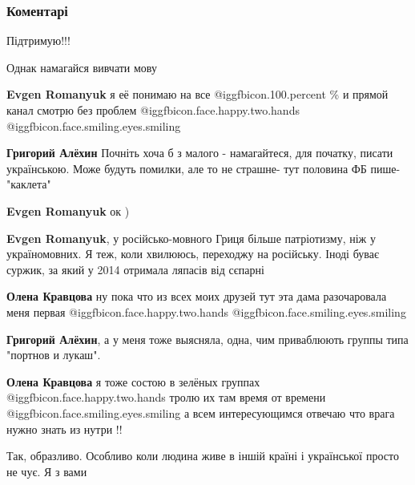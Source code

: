  
 
 
 
 
\subsubsection{Коментарі}

\begin{itemize} %
Підтримую!!!

Однак намагайся вивчати мову

\begin{itemize} %
\textbf{Evgen Romanyuk} я её понимаю на все  @igg{fbicon.100.percent} 
\% и прямой канал смотрю без проблем  @igg{fbicon.face.happy.two.hands}   @igg{fbicon.face.smiling.eyes.smiling} 

\textbf{Григорий Алёхин} Почніть хоча б з малого - намагайтеся, для початку, писати українською. Може будуть помилки, але то не страшне- тут половина ФБ пише-"каклета"

\textbf{Evgen Romanyuk} ок )

\textbf{Evgen Romanyuk}, у російсько-мовного Гриця більше патріотизму, ніж у україномовних.
Я теж, коли хвилююсь, переходжу на російську. Іноді буває суржик, за який у 2014 отримала ляпасів від сєпарні

\textbf{Олена Кравцова} ну пока что из всех моих друзей тут эта дама разочаровала меня первая  @igg{fbicon.face.happy.two.hands}  @igg{fbicon.face.smiling.eyes.smiling} 

\textbf{Григорий Алёхин}, а у меня тоже выясняла, одна, чим приваблюють группы типа "портнов и лукаш".

\textbf{Олена Кравцова} я тоже состою в зелёных группах  @igg{fbicon.face.happy.two.hands}  тролю их там время от времени  @igg{fbicon.face.smiling.eyes.smiling}  а всем интересующимся отвечаю что врага нужно знать из нутри !!
\end{itemize} %

Так, образливо. Особливо коли людина живе в іншій країні і української просто не чує. Я з вами


\end{itemize}
